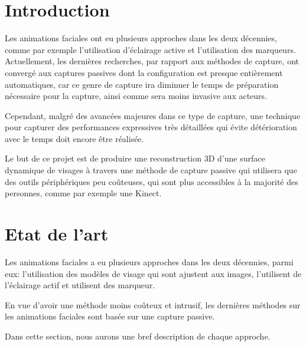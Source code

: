 \documentclass[a4paper,12pt]{article}
\begin{document}
\newpage
\thispagestyle{empty}
\tableofcontents
\newpage
\setcounter{page}{1}

\section{Introduction}

Les animations faciales ont eu plusieurs approches dans les deux
décennies, comme par exemple l'utilisation d'éclairage active et
l'utilisation des marqueurs. Actuellement, les dernières recherches,
par rapport aux méthodes de capture, ont convergé aux captures passives dont la
configuration est presque entièrement automatiques, car ce genre de
capture ira diminuer le temps de préparation nécessaire pour la
capture, ainsi comme sera moins invasive aux acteurs.

Cependant, malgré des avancées majeures dans ce type de capture, une
technique pour capturer des performances expressives très détaillées
qui évite détérioration avec le temps doit encore être réalisée.

Le but de ce projet est de produire une reconstruction 3D d'une
surface dynamique de visages à travers une méthode de capture passive
qui utilisera que des outils périphériques peu coûteuses, qui sont
plus accessibles à la majorité des personnes, comme par exemple une Kinect.



\section{Etat de l'art}

Les animations faciales a eu plusieurs approches dans les deux décennies, 
parmi eux: l'utilisation des modèles de visage qui sont ajustent aux images, 
l'utilisent de l'éclairage actif et utilisent des marqueur.

En vue d'avoir une méthode moins coûteux et intrusif, les dernières
méthodes sur les animations faciales sont basée sur une capture
passive.


Dans cette section, nous aurons une bref description de chaque approche.
\end{document}

